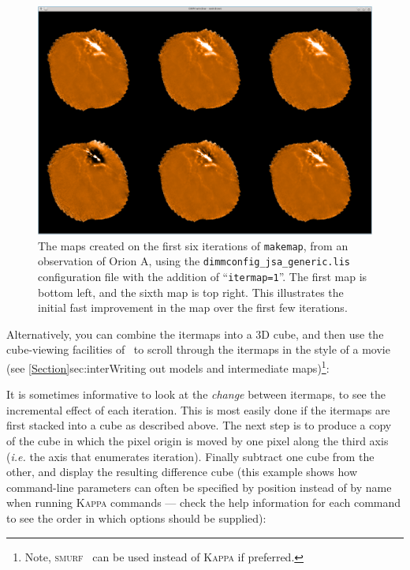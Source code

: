 \begin{terminalv}
\begin{figure}
\begin{center}
  \includegraphics[width=\linewidth]{sc21_itermaps}
\end{center}
\caption[Initial six itermaps]{\small The maps created on the first six
iterations of \texttt{makemap}, from an observation of Orion A, using the
\texttt{dimmconfig\_jsa\_generic.lis} configuration file with the addition
of ``\texttt{itermap=1}''. The first map is bottom left, and the sixth
map is top right. This illustrates the initial fast improvement
in the map over the first few iterations.}
\label{fig:itermaps}
\end{figure}

Alternatively, you can combine the itermaps into a 3D cube, and then use
the cube-viewing facilities of \gaia\ to scroll through the itermaps in the
style of a movie (see \cref{Section}{sec:inter}{Writing out models and
intermediate maps})\footnote{Note, \textsc{smurf} \stackframes\ can be used
instead of \textsc{Kappa}  if preferred.}:

\begin{terminalv}
\end{terminalv}

It is sometimes informative
to look at the \emph{change} between
itermaps, to see the incremental effect of each iteration. This is most
easily done if the itermaps are first stacked into a cube as described
above. The next step is to produce a copy of the cube in which the pixel
origin is moved by one pixel along the third axis (\emph{i.e.} the axis
that enumerates iteration). Finally subtract one cube from the other, and
display the resulting difference cube (this example shows how command-line
parameters can often be specified by position instead of by name when
running \textsc{Kappa} commands --- check the help information for each
command to see the order in which options should be supplied):


\end{terminalv}
